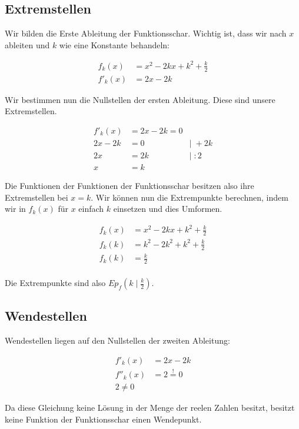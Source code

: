 \documentclass[12pt,a4paper]{article}
\begin{document}
\subsection{Extremstellen}

Wir bilden die Erste Ableitung der Funktionsschar. Wichtig ist, dass wir nach $x$ ableiten und $k$ wie eine Konstante behandeln:

$$
\begin{aligned}
    f_k(x) &= x^2 - 2kx + k^2 + \frac{k}{2} \\
    f'_k(x) &= 2x - 2k
\end{aligned}
$$

Wir bestimmen nun die Nullstellen der ersten Ableitung. Diese sind unsere Extremstellen.

$$
\begin{aligned}
    f'_k(x) &= 2x - 2k = 0 \\
    2x - 2k &= 0 &|\; + 2k \\
    2x &= 2k &| \; :2 \\
    x &= k
\end{aligned}
$$

Die Funktionen der Funktionen der Funktionsschar besitzen also ihre Extremstellen bei $x = k$. Wir können nun die Extrempunkte berechnen, indem wir in $f_k(x)$ für $x$ einfach $k$ einsetzen und dies Umformen.

$$
\begin{aligned}
    f_k(x)&= x^2 - 2kx + k^2 + \frac{k}{2} \\
    f_k(k)&= k^2 - 2k^2 + k^2 + \frac{k}{2} \\
    f_k(k)&= \frac{k}{2} \\
\end{aligned}
$$

Die Extrempunkte sind also $Ep_f(k \mid \frac{k}{2})$.

\subsection{Wendestellen}

Wendestellen liegen auf den Nullstellen der zweiten Ableitung:

$$
\begin{aligned}
    f'_k(x) &= 2x - 2k \\
    f''_k(x) &= 2 \overset{!}{=} 0 \\
    2 \ne 0
\end{aligned}
$$

Da diese Gleichung keine Lösung in der Menge der reelen Zahlen besitzt, besitzt keine Funktion der Funktionsschar einen Wendepunkt.
\end{document}
